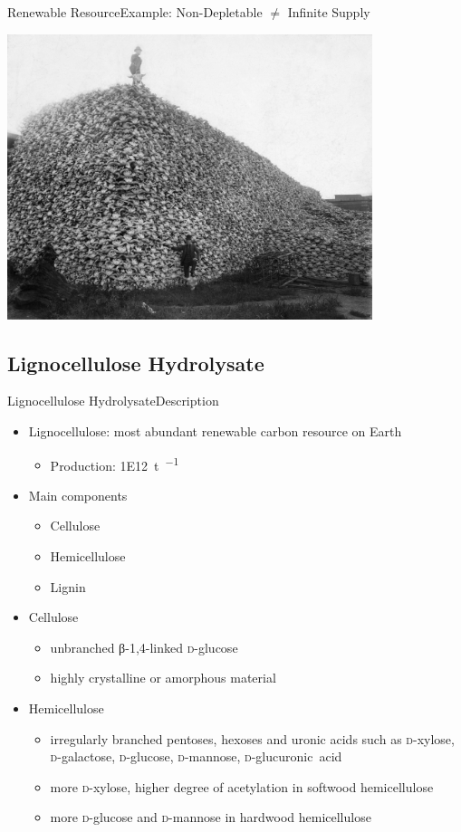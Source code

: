 \documentclass[mathserif]{beamer}
\newcommand{\LCH}{Lignocellulose Hydrolysate}
\newcommand{\glc}{\textsc{d}-glu\-cose}
\newcommand{\glcua}{\textsc{d}-glu\-cu\-ron\-ic~acid}
\newcommand{\xyl}{\textsc{d}-xy\-lose}
\newcommand{\man}{\textsc{d}-man\-nose}
\newcommand{\gal}{\textsc{d}-ga\-lac\-tose}
\begin{document}
\begin{frame}{Renewable Resource}{Example: Non-Depletable $\neq$ Infinite Supply}
	\begin{center}
		\includegraphics[width=0.8\textwidth]{../doc/fig/Bison_skull_pile_grey_stretched_small.jpg}
	\end{center}
\end{frame}

\subsection{\LCH{}}

\begin{frame}{\LCH{}}{Description}
	\begin{itemize}
		\item Lignocellulose: most abundant renewable carbon resource on Earth
		\begin{itemize}
			\item Production: \SI{1E12}{\tonne\per\year}
		\end{itemize}
		\pause
		\item Main components
		\begin{itemize}
			\item Cellulose
			\item Hemicellulose
			\item Lignin
		\end{itemize}
		\pause
		\item Cellulose
		\begin{itemize}
			\item unbranched β-1,4-linked \glc{}
			\item highly crystalline or amorphous material
		\end{itemize}
		\pause
		\item Hemicellulose
		\begin{itemize}
			\item irregularly branched pentoses, hexoses and uronic acids such as \xyl{}, \gal{}, \glc{}, \man{}, \glcua{}
			\item more \xyl{}, higher degree of acetylation in softwood hemicellulose
			\item more \glc{} and \man{} in hardwood hemicellulose
		\end{itemize}
	\end{itemize}
\end{frame}
\end{document}
